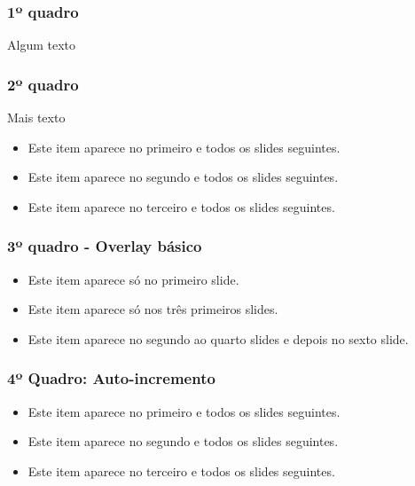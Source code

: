 \documentclass{beamer}
\begin{document}
\begin{frame}
    \frametitle{1º quadro}
    Algum texto
\end{frame}

\begin{frame}
    \frametitle{2º quadro}
    Mais texto
    \begin{itemize}
        \item<1-> Este item aparece no primeiro e todos os slides seguintes.
        \item<2-> Este item aparece no segundo e todos os slides seguintes.
        \item<3-> Este item aparece no terceiro e todos os slides seguintes.        
    \end{itemize}
\end{frame}

\begin{frame}
    \frametitle{3º quadro - Overlay básico}
    \begin{itemize}
        \item<1> Este item aparece só no primeiro slide.
        \item<-3> Este item aparece só nos três primeiros slides.
        \item<2-4,6> Este item aparece no segundo ao quarto slides e depois no sexto slide.

        
    \end{itemize}
\end{frame}

\begin{frame}
    \frametitle{4º Quadro: Auto-incremento}
    \begin{itemize}
        \item<+-> Este item aparece no primeiro e todos os slides seguintes.
        \item<+-> Este item aparece no segundo e todos os slides seguintes.
        \item<+-> Este item aparece no terceiro e todos os slides seguintes.
    \end{itemize}
    
\end{frame}
\end{document}
